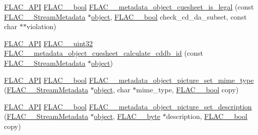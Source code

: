 \begin{DoxyCompactItemize}
\item 
\mbox{\hyperlink{group__flac__export_ga56ca07df8a23310707732b1c0007d6f5}{F\+L\+A\+C\+\_\+\+A\+PI}} \mbox{\hyperlink{ordinals_8h_a95103469f1cbd78b8cf250194985b34e}{F\+L\+A\+C\+\_\+\+\_\+bool}} \mbox{\hyperlink{group__flac__metadata__object_ga1160f85e437c1a763ec0a8f372cb1390}{F\+L\+A\+C\+\_\+\+\_\+metadata\+\_\+object\+\_\+cuesheet\+\_\+is\+\_\+legal}} (const \mbox{\hyperlink{struct_f_l_a_c_____stream_metadata}{F\+L\+A\+C\+\_\+\+\_\+\+Stream\+Metadata}} $\ast$\mbox{\hyperlink{_s_d_l__opengl__glext_8h_ab49790263c78300fbf05719e38246198}{object}}, \mbox{\hyperlink{ordinals_8h_a95103469f1cbd78b8cf250194985b34e}{F\+L\+A\+C\+\_\+\+\_\+bool}} check\+\_\+cd\+\_\+da\+\_\+subset, const char $\ast$$\ast$violation)
\item 
\mbox{\hyperlink{group__flac__export_ga56ca07df8a23310707732b1c0007d6f5}{F\+L\+A\+C\+\_\+\+A\+PI}} \mbox{\hyperlink{ordinals_8h_a9c4005ea7ef8d564b0cc993cdd0e4e5e}{F\+L\+A\+C\+\_\+\+\_\+uint32}} \mbox{\hyperlink{group__flac__metadata__object_ga897138ca0a985d8741f73d6657f38845}{F\+L\+A\+C\+\_\+\+\_\+metadata\+\_\+object\+\_\+cuesheet\+\_\+calculate\+\_\+cddb\+\_\+id}} (const \mbox{\hyperlink{struct_f_l_a_c_____stream_metadata}{F\+L\+A\+C\+\_\+\+\_\+\+Stream\+Metadata}} $\ast$\mbox{\hyperlink{_s_d_l__opengl__glext_8h_ab49790263c78300fbf05719e38246198}{object}})
\item 
\mbox{\hyperlink{group__flac__export_ga56ca07df8a23310707732b1c0007d6f5}{F\+L\+A\+C\+\_\+\+A\+PI}} \mbox{\hyperlink{ordinals_8h_a95103469f1cbd78b8cf250194985b34e}{F\+L\+A\+C\+\_\+\+\_\+bool}} \mbox{\hyperlink{group__flac__metadata__object_ga5db3363648b6e7693e032f200f241e85}{F\+L\+A\+C\+\_\+\+\_\+metadata\+\_\+object\+\_\+picture\+\_\+set\+\_\+mime\+\_\+type}} (\mbox{\hyperlink{struct_f_l_a_c_____stream_metadata}{F\+L\+A\+C\+\_\+\+\_\+\+Stream\+Metadata}} $\ast$\mbox{\hyperlink{_s_d_l__opengl__glext_8h_ab49790263c78300fbf05719e38246198}{object}}, char $\ast$mime\+\_\+type, \mbox{\hyperlink{ordinals_8h_a95103469f1cbd78b8cf250194985b34e}{F\+L\+A\+C\+\_\+\+\_\+bool}} copy)
\item 
\mbox{\hyperlink{group__flac__export_ga56ca07df8a23310707732b1c0007d6f5}{F\+L\+A\+C\+\_\+\+A\+PI}} \mbox{\hyperlink{ordinals_8h_a95103469f1cbd78b8cf250194985b34e}{F\+L\+A\+C\+\_\+\+\_\+bool}} \mbox{\hyperlink{group__flac__metadata__object_ga5582649e395e70a4b3df510a39d70cc5}{F\+L\+A\+C\+\_\+\+\_\+metadata\+\_\+object\+\_\+picture\+\_\+set\+\_\+description}} (\mbox{\hyperlink{struct_f_l_a_c_____stream_metadata}{F\+L\+A\+C\+\_\+\+\_\+\+Stream\+Metadata}} $\ast$\mbox{\hyperlink{_s_d_l__opengl__glext_8h_ab49790263c78300fbf05719e38246198}{object}}, \mbox{\hyperlink{ordinals_8h_a5eb569b12d5b047cdacada4d57924ee3}{F\+L\+A\+C\+\_\+\+\_\+byte}} $\ast$description, \mbox{\hyperlink{ordinals_8h_a95103469f1cbd78b8cf250194985b34e}{F\+L\+A\+C\+\_\+\+\_\+bool}} copy)
$$
\end{DoxyCompactItemize}

